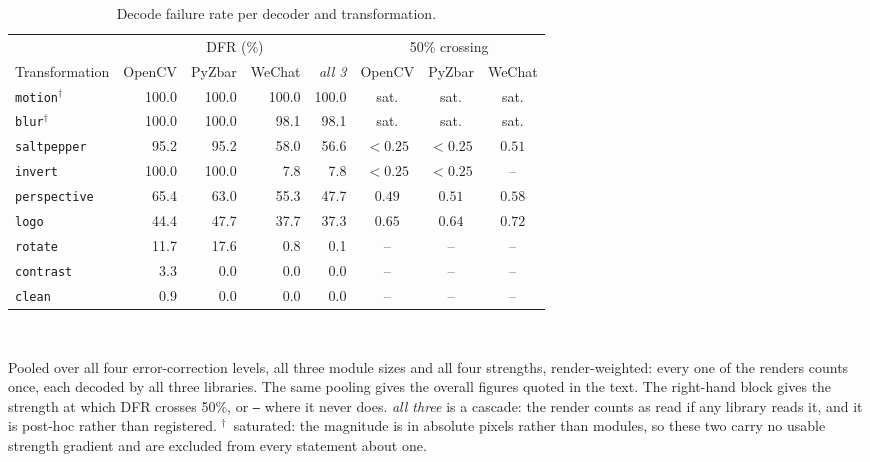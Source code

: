 \begin{table}[htbp]
\centering\small
\caption{Decode failure rate per decoder and transformation.}
\label{tab:qr_dfr}
\setlength{\tabcolsep}{4pt}\footnotesize
\begin{tabular}{lrrrrccc}
\toprule
& \multicolumn{4}{c}{DFR (\%)} & \multicolumn{3}{c}{50\% crossing} \\
\cmidrule(lr){2-5}\cmidrule(lr){6-8}
Transformation & OpenCV & PyZbar & WeChat & \emph{all 3} & OpenCV & PyZbar & WeChat \\
\midrule
\texttt{motion}$^{\dagger}$ & 100.0 & 100.0 & 100.0 & 100.0 & sat. & sat. & sat. \\
\texttt{blur}$^{\dagger}$ & 100.0 & 100.0 & 98.1 & 98.1 & sat. & sat. & sat. \\
\texttt{saltpepper} & 95.2 & 95.2 & 58.0 & 56.6 & $<0.25$ & $<0.25$ & $0.51$ \\
\texttt{invert} & 100.0 & 100.0 & 7.8 & 7.8 & $<0.25$ & $<0.25$ & -- \\
\texttt{perspective} & 65.4 & 63.0 & 55.3 & 47.7 & $0.49$ & $0.51$ & $0.58$ \\
\texttt{logo} & 44.4 & 47.7 & 37.7 & 37.3 & $0.65$ & $0.64$ & $0.72$ \\
\texttt{rotate} & 11.7 & 17.6 & 0.8 & 0.1 & -- & -- & -- \\
\texttt{contrast} & 3.3 & 0.0 & 0.0 & 0.0 & -- & -- & -- \\
\texttt{clean} & 0.9 & 0.0 & 0.0 & 0.0 & -- & -- & -- \\
\bottomrule
\end{tabular}
\\[4pt]
\begin{minipage}{0.94\linewidth}\footnotesize
Pooled over all four error-correction levels, all three module sizes and all four strengths,
render-weighted: every one of the \QrRenders{} renders counts once, each decoded by all three
libraries. The same pooling gives the overall figures quoted in the text. The right-hand block gives the
strength at which DFR crosses 50\%, or \texttt{--} where it never does. \emph{all three} is
a cascade: the render counts as read if any library reads it, and it is post-hoc rather than
registered.
$^{\dagger}$~saturated: the magnitude is in absolute pixels rather than modules, so these two carry
no usable strength gradient and are excluded from every statement about one.
\end{minipage}
\end{table}
